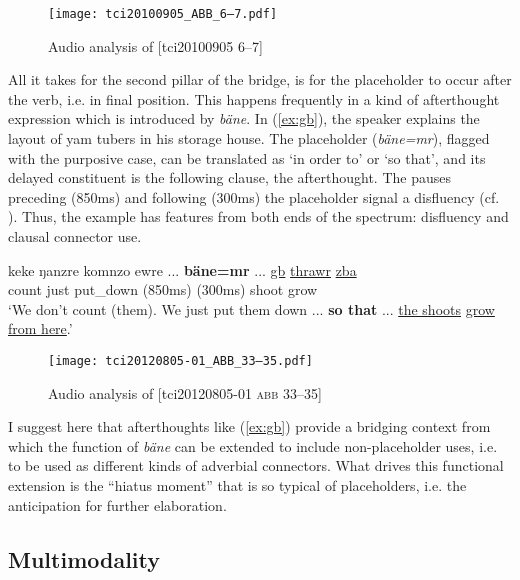 \documentclass[output=paper,colorlinks,citecolor=brown]{langscibook}
\begin{document}
\begin{figure}
    \texttt{[image: tci20100905\_ABB\_6–7.pdf]}
    \caption{Audio analysis of [tci20100905  6--7]}
    \label{fig:doehler:kukufia}
\end{figure}

\largerpage
All it takes for the second pillar of the bridge, is for the placeholder to occur after the verb, i.e. in final position. This happens frequently in a kind of afterthought expression which is introduced by \textit{bäne}. In (\ref{ex:gb}), the speaker explains the layout of yam tubers in his storage house. The placeholder (\textit{bäne=mr}), flagged with the purposive case, can be translated as `in order to' or `so that', and its delayed constituent is the following clause, the afterthought. The pauses preceding (850ms) and following (300ms) the placeholder signal a disfluency (cf. ). Thus, the example has features from both ends of the spectrum: disfluency and clausal connector use.

\ea \label{ex:gb}
    \gll keke ŋanzre komnzo ewre ... \textbf{bäne=mr} ... \uline{gb} \uline{thrawr} \uline{zba}\\
     count just put\_down (850ms)  (300ms) shoot grow \\
    \glt `We don't count (them). We just put them down ... \textbf{so that} ... \uline{the shoots} \uline{grow from here}.' 
\z

\begin{figure}
    \texttt{[image: tci20120805-01\_ABB\_33–35.pdf]}
    \caption{Audio analysis of [tci20120805-01 \textsc{abb} 33--35]}
    \label{fig:doehler:gb}
\end{figure}

I suggest here that afterthoughts like (\ref{ex:gb}) provide a bridging context from which the function of \textit{bäne} can be extended to include non-placeholder uses, i.e. to be used as different kinds of adverbial connectors. What drives this functional extension is the ``hiatus moment'' that is so typical of placeholders, i.e. the anticipation for further elaboration.

\subsection{Multimodality}\label{sec:doehler:gestures}
\end{document}
